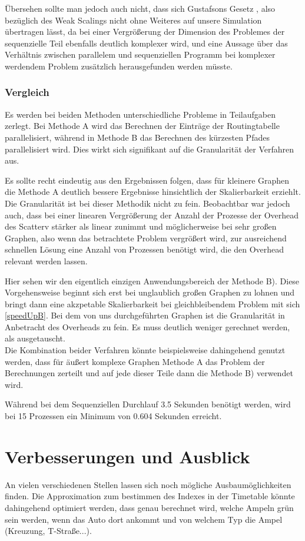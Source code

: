 \documentclass[paper=A4,pagesize=auto,12pt,headinclude=true,footinclude=true,BCOR=0mm,DIV=calc]{scrartcl}
\begin{document}
	Übersehen sollte man jedoch auch nicht, dass sich Gustafsons Gesetz \cite{PaPoBuch}, also bezüglich des Weak Scalings nicht ohne Weiteres auf unsere Simulation übertragen lässt, da bei einer Vergrößerung der Dimension des Problemes der sequenzielle Teil ebenfalls deutlich komplexer wird, und eine Aussage über das Verhältnis zwischen parallelem und sequenziellen Programm bei komplexer werdendem Problem zusätzlich herausgefunden werden müsste.
	\subsubsection{Vergleich}
	Es werden bei beiden Methoden unterschiedliche Probleme in Teilaufgaben zerlegt. Bei Methode A wird das Berechnen der Einträge der Routingtabelle parallelisiert, während in Methode B das Berechnen des kürzesten Pfades parallelisiert wird. Dies wirkt sich signifikant auf die Granularität der Verfahren aus.
	
	Es sollte recht eindeutig aus den Ergebnissen folgen, dass für kleinere Graphen die Methode A deutlich bessere Ergebnisse hinsichtlich der Skalierbarkeit erziehlt. Die Granularität ist bei dieser Methodik nicht zu fein. Beobachtbar war jedoch auch, dass bei einer linearen Vergrößerung der Anzahl der Prozesse der Overhead des Scatterv stärker als linear zunimmt und möglicherweise bei sehr großen Graphen, also wenn das betrachtete Problem vergrößert wird, zur ausreichend schnellen Lösung eine Anzahl von Prozessen benötigt wird, die den Overhead relevant werden lassen.
	
	Hier sehen wir den eigentlich einzigen Anwendungsbereich der Methode B). Diese Vorgehensweise beginnt sich erst bei unglaublich großen Graphen zu lohnen und bringt dann eine akzpetable Skalierbarkeit bei gleichbleibendem Problem mit sich \ref{speedUpB}. Bei dem von uns durchgeführten Graphen ist die Granularität in Anbetracht des Overheads zu fein. Es muss deutlich weniger gerechnet werden, als ausgetauscht.\\
	Die Kombination beider Verfahren könnte beispielsweise dahingehend genutzt werden, dass für äußert komplexe Graphen Methode A das Problem der Berechnungen zerteilt und auf jede dieser Teile dann die Methode B) verwendet wird.

	
	
	
	
	
	
	Während bei dem Sequenziellen Durchlauf 3.5 Sekunden benötigt werden, wird bei 15 Prozessen ein Minimum von 0.604 Sekunden erreicht.
	\section{Verbesserungen und Ausblick}
	An vielen verschiedenen Stellen lassen sich noch mögliche Ausbaumöglichkeiten finden. Die Approximation zum bestimmen des Indexes in der Timetable könnte dahingehend optimiert werden, dass genau berechnet wird, welche Ampeln grün sein werden, wenn das Auto dort ankommt und von welchem Typ die Ampel (Kreuzung, T-Straße...). 
	
\end{document}
